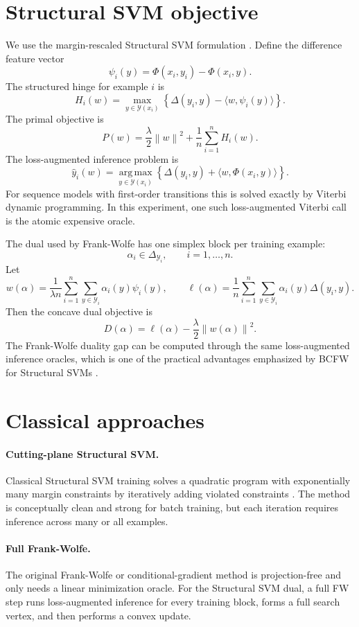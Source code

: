 \documentclass[11pt,a4paper]{article}
\newcommand{\Y}{\mathcal{Y}}
\newcommand{\argmax}{\operatorname*{arg\,max}}
\newcommand{\norm}[1]{\left\lVert #1 \right\rVert}
\begin{document}
\section{Structural SVM objective}

We use the margin-rescaled Structural SVM formulation \citep{tsochantaridis2005large,joachims2009cutting}. Define the difference feature vector
\[
  \psi_i(y) = \Phi(x_i,y_i)-\Phi(x_i,y).
\]
The structured hinge for example \(i\) is
\[
  H_i(w) = \max_{y\in\Y(x_i)}
    \left\{
      \Delta(y_i,y) - \langle w,\psi_i(y)\rangle
    \right\}.
\]
The primal objective is
\[
  P(w) =
  \frac{\lambda}{2}\norm{w}^2 +
  \frac{1}{n}\sum_{i=1}^{n} H_i(w).
\]
The loss-augmented inference problem is
\[
  \hat y_i(w) =
  \argmax_{y\in\Y(x_i)}
    \left\{
      \Delta(y_i,y) + \langle w,\Phi(x_i,y)\rangle
    \right\}.
\]
For sequence models with first-order transitions this is solved exactly by Viterbi dynamic programming. In this experiment, one such loss-augmented Viterbi call is the atomic expensive oracle.

The dual used by Frank-Wolfe has one simplex block per training example:
\[
  \alpha_i \in \Delta_{\Y_i}, \qquad i=1,\ldots,n.
\]
Let
\[
  w(\alpha) =
  \frac{1}{\lambda n}
  \sum_{i=1}^{n}\sum_{y\in\Y_i}\alpha_i(y)\psi_i(y),
  \qquad
  \ell(\alpha) =
  \frac{1}{n}
  \sum_{i=1}^{n}\sum_{y\in\Y_i}\alpha_i(y)\Delta(y_i,y).
\]
Then the concave dual objective is
\[
  D(\alpha) =
  \ell(\alpha) -
  \frac{\lambda}{2}\norm{w(\alpha)}^2.
\]
The Frank-Wolfe duality gap can be computed through the same loss-augmented inference oracles, which is one of the practical advantages emphasized by BCFW for Structural SVMs \citep{lacostejulien2013bcfw}.

\section{Classical approaches}

\paragraph{Cutting-plane Structural SVM.}
Classical Structural SVM training solves a quadratic program with exponentially many margin constraints by iteratively adding violated constraints \citep{tsochantaridis2005large,joachims2009cutting}. The method is conceptually clean and strong for batch training, but each iteration requires inference across many or all examples.

\paragraph{Full Frank-Wolfe.}
The original Frank-Wolfe or conditional-gradient method \citep{frank1956algorithm,jaggi2013frankwolfe} is projection-free and only needs a linear minimization oracle. For the Structural SVM dual, a full FW step runs loss-augmented inference for every training block, forms a full search vertex, and then performs a convex update.
\end{document}
